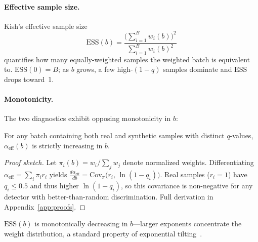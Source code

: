 \paragraph{Effective sample size.}
Kish's effective sample size~\citep{vehtari_2024_psis}
\begin{equation}
  \mathrm{ESS}(b) = \frac{\bigl(\sum_{i=1}^{B} w_i(b)\bigr)^{2}}{\sum_{i=1}^{B} w_i(b)^{2}}
  \label{eq:ess}
\end{equation}
quantifies how many equally-weighted samples the weighted batch is equivalent to.
$\mathrm{ESS}(0) = B$; as $b$ grows, a few high-$(1{-}q)$ samples dominate and $\mathrm{ESS}$ drops toward~1.

\paragraph{Monotonicity.}
The two diagnostics exhibit opposing monotonicity in $b$:

\begin{proposition}
\label{prop:monotone}
For any batch containing both real and synthetic samples with distinct $q$-values, $\alpha_{\mathrm{eff}}(b)$ is strictly increasing in $b$.
\end{proposition}

\begin{proof}[Proof sketch]
Let $\pi_i(b) = w_i / \sum_j w_j$ denote normalized weights.
Differentiating $\alpha_{\mathrm{eff}} = \sum_i \pi_i r_i$ yields
$\frac{d\alpha_{\mathrm{eff}}}{db} = \mathrm{Cov}_{\pi}\!\bigl(r_i,\, \ln(1{-}q_i)\bigr)$.
Real samples ($r_i = 1$) have $q_i \leq 0.5$ and thus higher $\ln(1{-}q_i)$, so this covariance is non-negative for any detector with better-than-random discrimination.
Full derivation in Appendix~\ref{app:proofs}.
\end{proof}

\noindent $\mathrm{ESS}(b)$ is monotonically decreasing in $b$---larger exponents concentrate the weight distribution, a standard property of exponential tilting~\citep{kimura_2024_iw_survey}.

